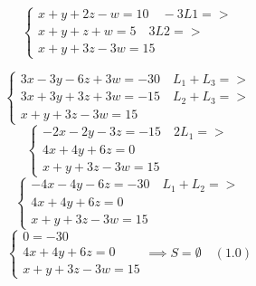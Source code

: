 \documentclass{article}
\begin{document}
\[
\begin{cases}
x + y + 2z - w = 10 \quad -3L1 => \\
x + y + z + w = 5 \quad 3L2 => \\
x + y + 3z - 3w = 15
\end{cases}
\]

\[
\begin{cases}
3x - 3y - 6z + 3w = -30 \quad L_1+L_3 => \\
3x + 3y + 3z + 3w = -15 \quad L_2+L_3 => \\
x + y + 3z - 3w = 15 
\end{cases}
\]
\[
\begin{cases}
-2x - 2y - 3z = -15 \quad 2L_1 => \\
4x + 4y + 6z = 0 \\
x + y + 3z - 3w = 15 
\end{cases}
\]
\[
\begin{cases}
-4x - 4y - 6z = -30 \quad L_1+L_2 =>  \\
4x + 4y + 6z = 0 \\
x + y + 3z - 3w = 15
\end{cases}
\]
\[
\begin{cases}
0 = -30 \\
4x + 4y + 6z = 0 \\
x + y + 3z - 3w = 15
\end{cases}
\implies S = \emptyset \quad (1.0)
\]
\end{document}
